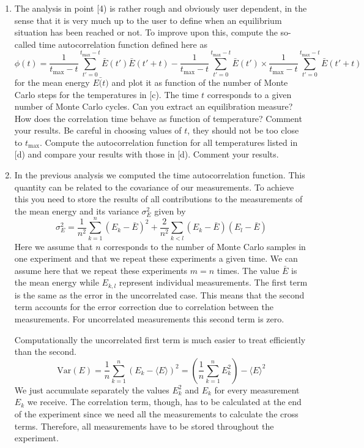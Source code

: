 \begin{prob}
\begin{enumerate}
\item 
The analysis in point [4) 
is rather rough and obviously user dependent, in the sense that it is
very much up to the user to define when an equilibrium situation has been reached or not.
To improve upon this, compute the so-called time autocorrelation function defined here as
\[
\phi(t)  = \frac{1}{t_{\mathrm{max}}-t}\sum_{t'=0}^{t_{\mathrm{max}}-t}\bar E(t')\bar E(t'+t)
-\frac{1}{t_{\mathrm{max}}-t}\sum_{t'=0}^{t_{\mathrm{max}}-t}\bar E(t')\times
\frac{1}{t_{\mathrm{max}}-t}\sum_{t'=0}^{t_{\mathrm{max}}-t}\bar E(t'+t)
\]
for the mean energy $E\bar (t)$ and plot it 
as function of the number of Monte Carlo steps for the temperatures in [c).
The time $t$ corresponds to a given number of Monte Carlo cycles.
Can you extract an equilibration measure?  How does the correlation time behave
as function of temperature?  Comment your results.  
Be careful in choosing values of $t$, they should not be  too close to $t_{\mathrm{max}}$.
Compute the autocorrelation function for all temperatures listed in [d) and compare your results with those in [d). Comment your results. 
\item  In the previous analysis we computed the time autocorrelation  function. This quantity can be related to the covariance of our measurements. 
To achieve this you need to store the results of all contributions to the measurements of the mean energy and its variance $\sigma_E^2$ given by     
\[
\sigma_E^2 =\frac{1}{n^2}\sum_{k=1}^n (E_k - \bar E)^2 +
\frac{2}{n^2}\sum_{k<l} (E_k - \bar E)(E_l - \bar E)
\]
Here we assume that $n$ corresponds to the number of Monte Carlo samples in one
experiment and that we repeat these experiments a given time.  We can assume here that we repeat these experiments $m=n$ times.  
The value $\bar E$ is the mean energy while $E_{k,l}$ represent individual measurements. 
The first term is the same as the error in the uncorrelated case.
This means that the second
term accounts for the error correction due to correlation between the
measurements. For uncorrelated measurements this second term is zero.

Computationally the uncorrelated first term is much easier to treat
efficiently than the second.
\[
\mathrm{Var}(E) = \frac{1}{n}\sum_{k=1}^n (E_k - \langle E\rangle)^2 =
\left(\frac{1}{n}\sum_{k=1}^n E_k^2\right) - \langle E\rangle^2
\]
We just accumulate separately the values $E_k^2$ and $E_k$ for every
measurement $E_k$ we receive. The correlation term, though, has to be
calculated at the end of the experiment since we need all the
measurements to calculate the cross terms. Therefore, all measurements
have to be stored throughout the experiment.


\end{enumerate}
\end{prob}
